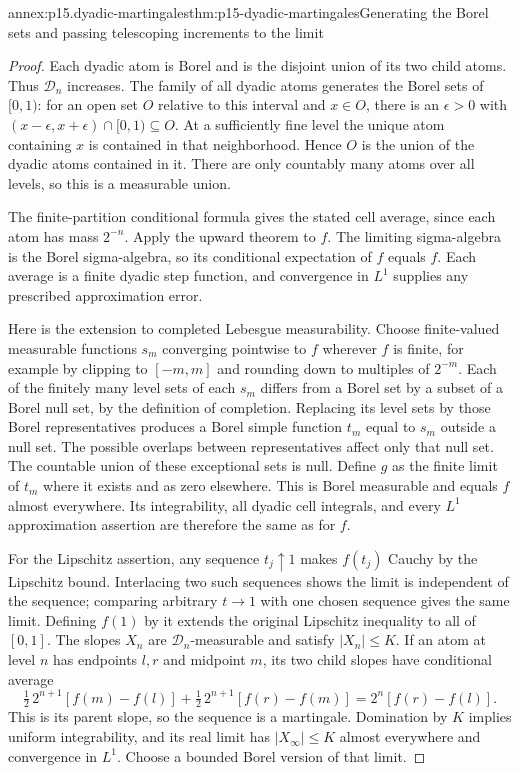 \begin{annexitem}{annex:p15.dyadic-martingales}{thm:p15-dyadic-martingales}{Generating the Borel sets and passing telescoping increments to the limit}
\begin{proof}
Each dyadic atom is Borel and is the disjoint union of its two child
atoms. Thus \(\mathcal D_n\) increases. The family of all dyadic atoms
generates the Borel sets of \([0,1)\): for an open set \(O\) relative
to this interval and \(x\in O\), there is an \(\epsilon>0\) with
\((x-\epsilon,x+\epsilon)\cap[0,1)\subseteq O\).
At a sufficiently fine level the unique atom containing \(x\)
is contained in that neighborhood. Hence \(O\) is the union of the
dyadic atoms contained in it. There are only countably many atoms
over all levels, so this is a measurable union.

The finite-partition conditional formula gives the stated cell average,
since each atom has mass \(2^{-n}\). Apply the upward theorem to \(f\).
The limiting sigma-algebra is the Borel sigma-algebra, so its conditional
expectation of \(f\) equals \(f\). Each average is a finite dyadic step
function, and convergence in \(L^1\) supplies any prescribed approximation
error.

Here is the extension to completed Lebesgue measurability.
Choose finite-valued measurable functions \(s_m\) converging pointwise
to \(f\) wherever \(f\) is finite, for example by clipping to \([-m,m]\)
and rounding down to multiples of \(2^{-m}\).
Each of the finitely many level sets of each \(s_m\) differs from a
Borel set by a subset of a Borel null set, by the definition of
completion. Replacing its level sets by those Borel representatives
produces a Borel simple function \(t_m\) equal to \(s_m\) outside a
null set. The possible overlaps between representatives affect only
that null set. The countable union of these exceptional sets is null.
Define \(g\) as the finite limit of \(t_m\) where it exists and as zero
elsewhere. This is Borel measurable and equals \(f\) almost everywhere.
Its integrability, all dyadic cell integrals, and every \(L^1\)
approximation assertion are therefore the same as for \(f\).

For the Lipschitz assertion, any sequence \(t_j\uparrow1\) makes
\(f(t_j)\) Cauchy by the Lipschitz bound. Interlacing two such sequences
shows the limit is independent of the sequence; comparing arbitrary
\(t\to1\) with one chosen sequence gives the same limit.
Defining \(f(1)\) by it extends the original Lipschitz inequality to
all of \([0,1]\).
The slopes \(X_n\) are \(\mathcal D_n\)-measurable and satisfy
\(|X_n|\leq K\). If an atom at level \(n\) has endpoints \(l,r\)
and midpoint \(m\), its two child slopes have conditional average
\[
 \tfrac12\,2^{n+1}[f(m)-f(l)]
 +\tfrac12\,2^{n+1}[f(r)-f(m)]
                   =2^n[f(r)-f(l)].
\]
This is its parent slope, so the sequence is a martingale.
Domination by \(K\) implies uniform integrability, and its real limit
has \(|X_\infty|\leq K\) almost everywhere and convergence in \(L^1\).
Choose a bounded Borel version of that limit.


\end{proof}
\end{annexitem}
